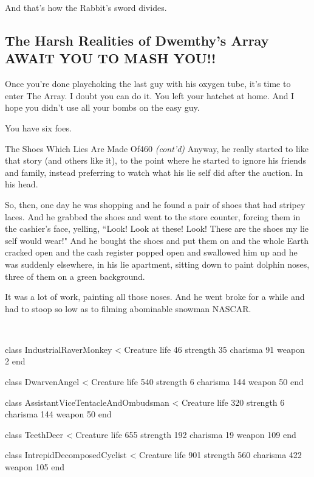 \documentclass[12pt,twoside]{report}
\begin{document}
And that's how the Rabbit's sword divides.

\bigskip



\subsection{The Harsh Realities of Dwemthy's \mbox{Array} AWAIT YOU TO MASH YOU!!}



Once you're done playchoking the last guy with his oxygen tube, it's
time to enter The Array.  I doubt you can do it.  You left your
hatchet at home.  And I hope you didn't use all your bombs on the easy
guy.

You have six foes.

\pagebreak


	\begin{sidebar}{The Shoes Which Lies Are Made Of}{460}
		\textit{(cont'd)} Anyway, he really started to like that story (and others like it), to the point where he started to ignore his friends and family, instead preferring to watch what his lie self did after the auction. In his head.\vspace{6pt}
		
		So, then, one day he was shopping and he found a pair of shoes that had stripey laces. And he grabbed the shoes and went to the store counter, forcing them in the cashier's face, yelling, ``Look! Look at these! Look! These are the shoes my lie self would wear!" And he bought the shoes and put them on and the whole Earth cracked open and the cash register popped open and swallowed him up and he was suddenly elsewhere, in his lie apartment, sitting down to paint dolphin noses, three of them on a green background.\vspace{6pt}

		It was a lot of work, painting all those noses. And he went broke for a while and had to stoop so low as to filming abominable snowman NASCAR.\vspace{6pt}
	\end{sidebar}

\ %
\vspace*{-36pt}

\begin{rubycode}

 class IndustrialRaverMonkey < Creature
   life 46
   strength 35
   charisma 91
   weapon 2
 end

 class DwarvenAngel < Creature
   life 540
   strength 6
   charisma 144
   weapon 50
 end

 class AssistantViceTentacleAndOmbudsman < Creature
   life 320
   strength 6
   charisma 144
   weapon 50
 end

 class TeethDeer < Creature
   life 655
   strength 192
   charisma 19
   weapon 109
 end

 class IntrepidDecomposedCyclist < Creature
   life 901
   strength 560
   charisma 422
   weapon 105
 end

\end{rubycode}
\end{document}
